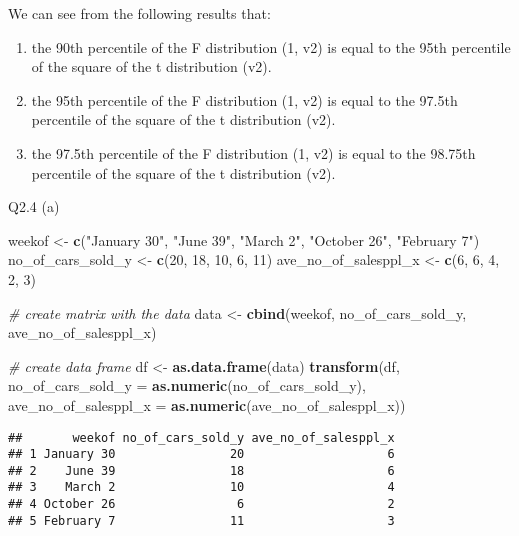 \documentclass[
]{article}
\newenvironment{Shaded}{\begin{snugshade}}{\end{snugshade}}
\newcommand{\AttributeTok}[1]{\textcolor[rgb]{0.13,0.29,0.53}{#1}}
\newcommand{\CommentTok}[1]{\textcolor[rgb]{0.56,0.35,0.01}{\textit{#1}}}
\newcommand{\DecValTok}[1]{\textcolor[rgb]{0.00,0.00,0.81}{#1}}
\newcommand{\FunctionTok}[1]{\textcolor[rgb]{0.13,0.29,0.53}{\textbf{#1}}}
\newcommand{\NormalTok}[1]{#1}
\newcommand{\OtherTok}[1]{\textcolor[rgb]{0.56,0.35,0.01}{#1}}
\newcommand{\StringTok}[1]{\textcolor[rgb]{0.31,0.60,0.02}{#1}}
\begin{document}
We can see from the following results that:

\begin{enumerate}
\def\labelenumi{\arabic{enumi}.}
\item
  the 90th percentile of the F distribution (1, v2) is equal to the 95th
  percentile of the square of the t distribution (v2).
\item
  the 95th percentile of the F distribution (1, v2) is equal to the
  97.5th percentile of the square of the t distribution (v2).
\item
  the 97.5th percentile of the F distribution (1, v2) is equal to the
  98.75th percentile of the square of the t distribution (v2).
\end{enumerate}

Q2.4 (a)

\begin{Shaded}
\begin{Highlighting}[]
\NormalTok{weekof }\OtherTok{\textless{}{-}} \FunctionTok{c}\NormalTok{(}\StringTok{"January 30"}\NormalTok{, }\StringTok{"June 39"}\NormalTok{, }\StringTok{"March 2"}\NormalTok{, }\StringTok{"October 26"}\NormalTok{, }\StringTok{"February 7"}\NormalTok{)}
\NormalTok{no\_of\_cars\_sold\_y }\OtherTok{\textless{}{-}} \FunctionTok{c}\NormalTok{(}\DecValTok{20}\NormalTok{, }\DecValTok{18}\NormalTok{, }\DecValTok{10}\NormalTok{, }\DecValTok{6}\NormalTok{, }\DecValTok{11}\NormalTok{)}
\NormalTok{ave\_no\_of\_salesppl\_x }\OtherTok{\textless{}{-}} \FunctionTok{c}\NormalTok{(}\DecValTok{6}\NormalTok{, }\DecValTok{6}\NormalTok{, }\DecValTok{4}\NormalTok{, }\DecValTok{2}\NormalTok{, }\DecValTok{3}\NormalTok{)}

\CommentTok{\# create matrix with the data}
\NormalTok{data }\OtherTok{\textless{}{-}} \FunctionTok{cbind}\NormalTok{(weekof, no\_of\_cars\_sold\_y, ave\_no\_of\_salesppl\_x)}

\CommentTok{\# create data frame}
\NormalTok{df }\OtherTok{\textless{}{-}} \FunctionTok{as.data.frame}\NormalTok{(data)}
\FunctionTok{transform}\NormalTok{(df, }\AttributeTok{no\_of\_cars\_sold\_y =} \FunctionTok{as.numeric}\NormalTok{(no\_of\_cars\_sold\_y), }\AttributeTok{ave\_no\_of\_salesppl\_x =} \FunctionTok{as.numeric}\NormalTok{(ave\_no\_of\_salesppl\_x))}
\end{Highlighting}
\end{Shaded}

\begin{verbatim}
##       weekof no_of_cars_sold_y ave_no_of_salesppl_x
## 1 January 30                20                    6
## 2    June 39                18                    6
## 3    March 2                10                    4
## 4 October 26                 6                    2
## 5 February 7                11                    3
\end{verbatim}
\end{document}
